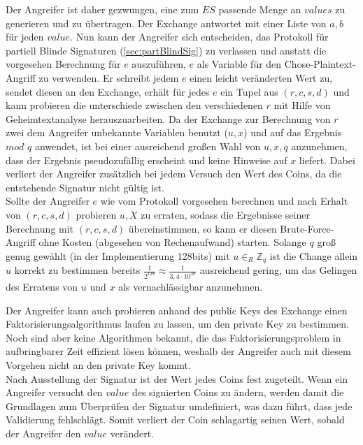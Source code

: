 \documentclass{scrreprt}
\begin{document}
Der Angreifer ist daher gezwungen, eine zum $ES$ passende Menge an $values$ zu generieren und zu übertragen. Der Exchange antwortet mit einer Liste von $a,b$ für jeden $value$. Nun kann der Angreifer sich entscheiden, das Protokoll für partiell Blinde Signaturen (\ref{sec:partBlindSig}) zu verlassen und anstatt die vorgesehen Berechnung für $e$ auszuführen, $e$ als Variable für den Chose-Plaintext-Angriff zu verwenden. Er schreibt jedem $e$ einen leicht veränderten Wert zu, sendet diesen an den Exchange, erhält für jedes $e$ ein Tupel aus $(r,c,s,d)$ und kann probieren die unterschiede zwischen den verschiedenen $r$ mit Hilfe von Geheimtextanalyse herauszuarbeiten. Da der Exchange zur Berechnung von $r$ zwei dem Angreifer unbekannte Variablen benutzt ($u,x$) und auf das Ergebnis $mod$ $q$ anwendet, ist bei einer ausreichend großen Wahl von $u,x,q$ anzunehmen, dass der Ergebnis pseudozufällig erscheint und keine Hinweise auf $x$ liefert. Dabei verliert der Angreifer zusätzlich bei jedem Versuch den Wert des Coins, da die entstehende Signatur nicht gültig ist.\\

Sollte der Angreifer $e$ wie vom Protokoll vorgesehen berechnen und nach Erhalt von $(r,c,s,d)$ probieren $u,X$ zu erraten, sodass die Ergebnisse seiner Berechnung mit $(r,c,s,d)$ übereinstimmen, so kann er diesen Brute-Force-Angriff ohne Kosten (abgesehen von Rechenaufwand) starten. Solange $q$ groß genug gewählt (in der Implementierung 128bits) mit $u{\in}_{R} {\mathbb{Z}}_{q}$ ist die Change allein $u$ korrekt zu bestimmen bereits $\frac{1}{2^{128}} \approx \frac{1}{3,4\cdot10^{38}}$ ausreichend gering, um das Gelingen des Erratens von $u$ und $x$ als vernachlässigbar anzunehmen.

Der Angreifer kann auch probieren anhand des public Keys des Exchange einen Faktorisierungsalgorithmus laufen zu lassen, um den private Key zu bestimmen. Noch sind aber keine Algorithmen bekannt, die das Faktorisierungsproblem in aufbringbarer Zeit effizient lösen können, weshalb der Angreifer auch mit diesem Vorgehen nicht an den private Key kommt.\\

Nach Ausstellung der Signatur ist der Wert jedes Coins fest zugeteilt. Wenn ein Angreifer versucht den $value$ des signierten Coins zu ändern, werden damit die Grundlagen zum Überprüfen der Signatur umdefiniert, was dazu führt, dass jede Validierung fehlschlägt. Somit verliert der Coin schlagartig seinen Wert, sobald der Angreifer den $value$ verändert.\\
\end{document}
